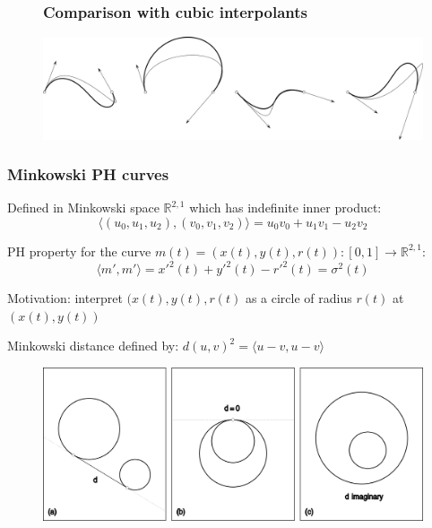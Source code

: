 \documentclass{beamer}
\begin{document}
\begin{frame}

\begin{figure}
\centering

\frametitle{Comparison with cubic interpolants}

\includegraphics{hermite_vs_cubic.png}
\end{figure}

\end{frame}

\begin{frame}

\frametitle{Minkowski PH curves}

Defined in Minkowski space $\mathbb{R}^{2,1}$ which has indefinite inner product:
\[
\langle (u_0, u_1, u_2), (v_0, v_1, v_2) \rangle = u_0v_0 + u_1v_1 - u_2v_2
\]

\pause
PH property for the curve $m(t) = (x(t), y(t), r(t)) : [0,1] \to \mathbb{R}^{2,1}$:
\[
\langle m', m' \rangle = x'^2(t) + y'^2(t) - r'^2(t) = \sigma^2(t)
\]

\pause
Motivation: interpret $(x(t), y(t), r(t)$ as a circle of radius $r(t)$ at $(x(t), y(t))$
\end{frame}

\begin{frame}
Minkowski distance defined by: $d(u,v)^2 = \langle u-v, u-v \rangle$

\begin{figure}
\centering
\includegraphics[width=\textwidth]{minkowski_metric.png}
\end{figure}
\end{frame}
\end{document}
